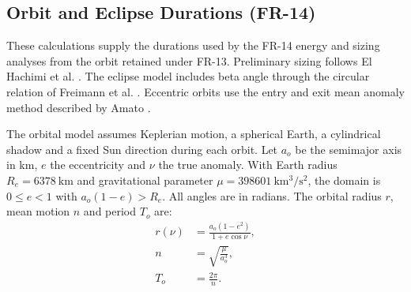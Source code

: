 \subsection{Orbit and Eclipse Durations (FR-14)}
These calculations supply the durations used by the FR-14 energy and sizing analyses from the orbit retained under FR-13. Preliminary sizing follows El Hachimi et al. \citep[Secs.~2--3, Eqs.~(1)--(10)]{handpicked-0003}. The eclipse model includes beta angle through the circular relation of Freimann et al. \citep[Sec.~IV, Eq.~(6)]{review-1231}. Eccentric orbits use the entry and exit mean anomaly method described by Amato \citep[Sec.~3.3.5, p.~59]{citation-4669}.

The orbital model assumes Keplerian motion, a spherical Earth, a cylindrical shadow and a fixed Sun direction during each orbit. Let $a_o$ be the semimajor axis in km, $e$ the eccentricity and $\nu$ the true anomaly. With Earth radius $R_e=6378~\mathrm{km}$ and gravitational parameter $\mu=398601~\mathrm{km^3/s^2}$, the domain is $0\leq e<1$ with $a_o(1-e)>R_e$. All angles are in radians. The orbital radius $r$, mean motion $n$ and period $T_o$ are:
\begin{align}
    r(\nu) &= \frac{a_o(1-e^2)}{1+e\cos\nu},
    \label{eq:orbital-radius} \\
    n &= \sqrt{\frac{\mu}{a_o^3}},
    \label{eq:mean-motion} \\
    T_o &= \frac{2\pi}{n}.
    \label{eq:orbit-period}
\end{align}

